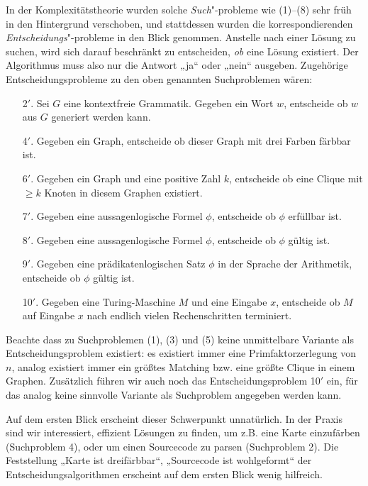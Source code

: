 In der Komplexitätstheorie wurden solche \emph{Such}"-probleme wie (1)–(8) sehr früh in den Hintergrund verschoben, und stattdessen wurden die korrespondierenden \emph{Entscheidungs}"-probleme in den Blick genommen. 
Anstelle nach einer Lösung zu suchen, wird sich darauf beschränkt zu entscheiden, \emph{ob} eine Lösung existiert. Der Algorithmus muss also nur die Antwort „ja“ oder „nein“ ausgeben. Zugehörige Entscheidungsprobleme zu den oben genannten Suchproblemen wären:
\begin{enumerate}[beginpenalty=0,midpenalty=0]
    \item[2$'$.] Sei $G$ eine kontextfreie Grammatik. Gegeben ein Wort $w$, entscheide ob $w$ aus $G$ generiert werden kann.
    \item[4$'$.] Gegeben ein Graph, entscheide ob dieser Graph mit drei Farben färbbar ist.
    \item[6$'$.] Gegeben ein Graph und eine positive Zahl $k$, entscheide ob eine Clique mit $\geq k$ Knoten in diesem Graphen existiert.
    \item[7$'$.] Gegeben eine aussagenlogische Formel $\phi$, entscheide ob $\phi$ erfüllbar ist.
    \item[8$'$.] Gegeben eine aussagenlogische Formel $\phi$, entscheide ob $\phi$ gültig ist.
    \item[9$'$.] Gegeben eine prädikatenlogischen Satz $\phi$ in der Sprache der Arithmetik, entscheide ob $\phi$ gültig ist.
    \item[10$'$.] Gegeben eine Turing-Maschine $M$ und eine Eingabe $x$, entscheide ob $M$ auf Eingabe $x$ nach endlich vielen Rechenschritten terminiert.
\end{enumerate}
Beachte dass zu Suchproblemen (1), (3) und (5) keine unmittelbare Variante als Entscheidungsproblem existiert: es existiert immer eine Primfaktorzerlegung von $n$, analog existiert immer ein größtes Matching bzw. eine größte Clique in einem Graphen.
Zusätzlich führen wir auch noch das Entscheidungsproblem 10$'$ ein, für das analog keine sinnvolle Variante als Suchproblem angegeben werden kann.

Auf dem ersten Blick erscheint dieser Schwerpunkt unnatürlich. In der Praxis sind wir interessiert, effizient Lösungen zu finden, um z.B. eine Karte einzufärben (Suchproblem 4), oder um einen Sourcecode zu parsen (Suchproblem 2). Die Feststellung „Karte ist dreifärbbar“, „Sourcecode ist wohlgeformt“ der Entscheidungsalgorithmen erscheint auf dem ersten Blick wenig hilfreich.

